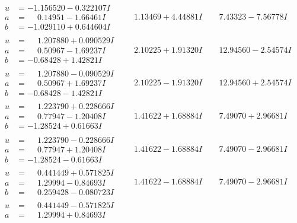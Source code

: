 \documentclass[1p]{elsarticle_modified}
\theoremstyle{definition}
\begin{document}
$$\begin{array}{c|c|c}
\begin{aligned}
u &= -1.156520 - 0.322107 I \\
a &= \phantom{-}0.14951 - 1.66461 I \\
b &= -1.029110 + 0.644604 I\end{aligned}
 & \phantom{-}1.13469 + 4.44881 I & \phantom{-}7.43323 - 7.56778 I \\ \hline\begin{aligned}
u &= \phantom{-}1.207880 + 0.090529 I \\
a &= \phantom{-}0.50967 - 1.69237 I \\
b &= -0.68428 + 1.42821 I\end{aligned}
 & \phantom{-}2.10225 + 1.91320 I & \phantom{-}12.94560 - 2.54574 I \\ \hline\begin{aligned}
u &= \phantom{-}1.207880 - 0.090529 I \\
a &= \phantom{-}0.50967 + 1.69237 I \\
b &= -0.68428 - 1.42821 I\end{aligned}
 & \phantom{-}2.10225 - 1.91320 I & \phantom{-}12.94560 + 2.54574 I \\ \hline\begin{aligned}
u &= \phantom{-}1.223790 + 0.228666 I \\
a &= \phantom{-}0.77947 - 1.20408 I \\
b &= -1.28524 + 0.61663 I\end{aligned}
 & \phantom{-}1.41622 + 1.68884 I & \phantom{-}7.49070 + 2.96681 I \\ \hline\begin{aligned}
u &= \phantom{-}1.223790 - 0.228666 I \\
a &= \phantom{-}0.77947 + 1.20408 I \\
b &= -1.28524 - 0.61663 I\end{aligned}
 & \phantom{-}1.41622 - 1.68884 I & \phantom{-}7.49070 - 2.96681 I \\ \hline\begin{aligned}
u &= \phantom{-}0.441449 + 0.571825 I \\
a &= \phantom{-}1.29994 - 0.84693 I \\
b &= \phantom{-}0.259428 - 0.080723 I\end{aligned}
 & \phantom{-}1.41622 - 1.68884 I & \phantom{-}7.49070 - 2.96681 I \\ \hline\begin{aligned}
u &= \phantom{-}0.441449 - 0.571825 I \\
a &= \phantom{-}1.29994 + 0.84693 I \\

\end{aligned}
\end{array}$$
\end{document}
